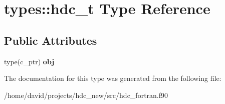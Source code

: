 \hypertarget{structtypes_1_1hdc__t}{}\section{types\+:\+:hdc\+\_\+t Type Reference}
\label{structtypes_1_1hdc__t}
\subsection*{Public Attributes}
\begin{DoxyCompactItemize}
\item 
type(c\+\_\+ptr) {\bfseries obj}\hypertarget{structtypes_1_1hdc__t_a3d68238bd16580d6c092d8bafc20f1c7}{}\label{structtypes_1_1hdc__t_a3d68238bd16580d6c092d8bafc20f1c7}

\end{DoxyCompactItemize}


The documentation for this type was generated from the following file\+:\begin{DoxyCompactItemize}
\item 
/home/david/projects/hdc\+\_\+new/src/hdc\+\_\+fortran.\+f90\end{DoxyCompactItemize}
